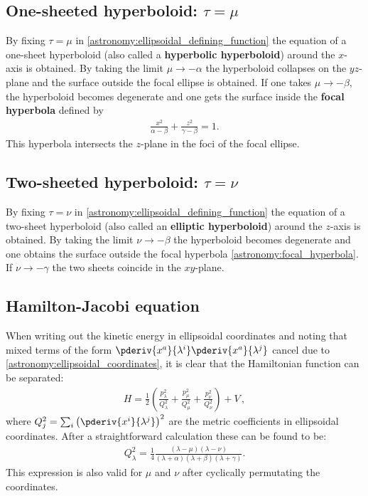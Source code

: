 \subsection{One-sheeted hyperboloid: \texorpdfstring{$\tau=\mu$}{tau equals mu}}

    By fixing $\tau=\mu$ in \eqref{astronomy:ellipsoidal_defining_function} the equation of a one-sheet hyperboloid (also called a \textbf{hyperbolic hyperboloid}) around the $x$-axis is obtained. By taking the limit $\mu\longrightarrow-\alpha$ the hyperboloid collapses on the $yz$-plane and the surface outside the focal ellipse is obtained. If one takes $\mu\longrightarrow-\beta$, the hyperboloid becomes degenerate and one gets the surface inside the \textbf{focal hyperbola} defined by
    \begin{gather}
        \label{astronomy:focal_hyperbola}
        \frac{x^2}{\alpha-\beta} + \frac{z^2}{\gamma-\beta} = 1.
    \end{gather}
    This hyperbola intersects the $z$-plane in the foci of the focal ellipse.

\subsection{Two-sheeted hyperboloid: \texorpdfstring{$\tau = \nu$}{}}

    By fixing $\tau=\nu$ in \eqref{astronomy:ellipsoidal_defining_function} the equation of a two-sheet hyperboloid (also called an \textbf{elliptic hyperboloid}) around the $z$-axis is obtained. By taking the limit $\nu\longrightarrow-\beta$ the hyperboloid becomes degenerate and one obtains the surface outside the focal hyperbola \eqref{astronomy:focal_hyperbola}. If $\nu\longrightarrow-\gamma$ the two sheets coincide in the $xy$-plane.

\subsection{Hamilton-Jacobi equation}

    When writing out the kinetic energy in ellipsoidal coordinates and noting that mixed terms of the form $\pderiv{x^a}{\lambda^i}\pderiv{x^a}{\lambda^j}$ cancel due to \eqref{astronomy:ellipsoidal_coordinates}, it is clear that the Hamiltonian function can be separated:
    \begin{gather}
        H = \frac{1}{2}\left(\frac{p_\lambda^2}{Q_\lambda^2} + \frac{p_\mu^2}{Q_\mu^2} + \frac{p_\nu^2}{Q_\nu^2}\right) + V\,,
    \end{gather}
    where $Q_j^2 = \sum_i\left(\pderiv{x^i}{\lambda^j}\right)^2$ are the metric coefficients in ellipsoidal coordinates. After a straightforward calculation these can be found to be:
    \begin{gather}
        Q_\lambda^2 = \frac{1}{4}\frac{(\lambda-\mu)(\lambda-\nu)}{(\lambda+\alpha)(\lambda+\beta)(\lambda+\gamma)}.
    \end{gather}
    This expression is also valid for $\mu$ and $\nu$ after cyclically permutating the coordinates.

